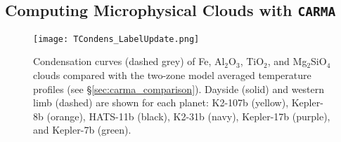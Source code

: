 \documentclass[twocolumn]{aastex63}
\begin{document}


\subsection{Computing Microphysical Clouds with \texttt{CARMA}}\label{sec:carma}

\begin{figure}[t]
    \centering
    \texttt{[image: TCondens\_LabelUpdate.png]}
    \caption{Condensation curves (dashed grey) of Fe, Al$_2$O$_3$, TiO$_2$, and Mg$_2$SiO$_4$ clouds compared with the two-zone model averaged temperature profiles (see \S\ref{sec:carma_comparison}). Dayside (solid) and western limb (dashed) are shown for each planet: K2-107b (yellow), Kepler-8b (orange), HATS-11b (black), K2-31b (navy), Kepler-17b (purple), and Kepler-7b (green).}
    \label{fig:TCondens}
\end{figure}
\end{document}
